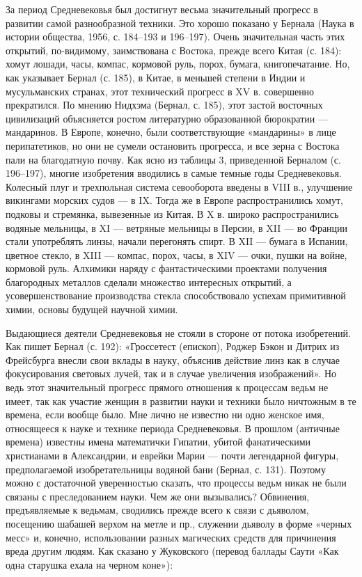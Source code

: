 За период Средневековья был достигнут весьма значительный прогресс в развитии
самой разнообразной техники. Это хорошо показано у Бернала (Наука в истории
общества, 1956, с. 184--193 и 196--197).
Очень значительная часть этих открытий, по-видимому, заимствована с Востока,
прежде всего Китая (с. 184): хомут лошади, часы, компас, кормовой руль, порох,
бумага, книгопечатание. Но, как указывает Бернал (с. 185), в Китае, в меньшей
степени в Индии и мусульманских странах, этот технический прогресс в XV в.
совершенно прекратился. По мнению Нидхэма (Бернал, с. 185), этот застой
восточных цивилизаций объясняется ростом литературно образованной бюрократии ---
мандаринов. В Европе, конечно, были соответствующие «мандарины» в лице
перипатетиков, но они не сумели остановить прогресса, и все зерна с Востока
пали на благодатную почву. Как ясно из таблицы 3, приведенной Берналом (с.
196--197), многие изобретения вводились в самые темные годы Средневековья.
Колесный плуг и трехпольная система севооборота введены в VIII в., улучшение
викингами морских судов --- в IX. Тогда же в Европе распространились хомут,
подковы и стремянка, вывезенные из Китая. В X в. широко распространились
водяные мельницы, в XI --- ветряные мельницы в Персии, в XII --- во Франции стали
употреблять линзы, начали перегонять спирт. В XII --- бумага в Испании, цветное
стекло, в XIII --- компас, порох, часы, в XIV --- очки, пушки на войне, кормовой
руль. Алхимики наряду с фантастическими проектами получения благородных
металлов сделали множество интересных открытий, а усовершенствование
производства стекла способствовало успехам примитивной химии, основы будущей
научной химии.

Выдающиеся деятели Средневековья не стояли в стороне от потока изобретений. Как
пишет Бернал (с. 192): «Гроссетест (епископ), Роджер Бэкон и Дитрих из
Фрейсбурга внесли свои вклады в науку, объяснив действие линз как в случае
фокусирования световых лучей, так и в случае увеличения изображений». Но ведь
этот значительный прогресс прямого отношения к процессам ведьм не имеет, так
как участие женщин в развитии науки и техники было ничтожным в те времена, если
вообще было. Мне лично не известно ни одно женское имя, относящееся к науке и
технике периода Средневековья. В прошлом (античные времена) известны имена
математички Гипатии, убитой фанатическими христианами в Александрии, и еврейки
Марии --- почти легендарной фигуры, предполагаемой изобретательницы водяной бани
(Бернал, с. 131). Поэтому можно с достаточной уверенностью сказать, что
процессы ведьм никак не были связаны с преследованием науки. Чем же они
вызывались? Обвинения, предъявляемые к ведьмам, сводились прежде всего к связи
с дьяволом, посещению шабашей верхом на метле и пр., служении дьяволу в форме
«черных месс» и, конечно, использовании разных магических средств для
причинения вреда другим людям. Как сказано у Жуковского (перевод баллады Саути
«Как одна старушка ехала на черном коне»):

